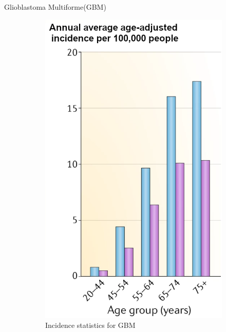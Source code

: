\documentclass[aspectratio=169,9pt]{beamer}
\begin{document}
\begin{frame}{Glioblastoma Multiforme(GBM)}
\begin{adjustwidth}{-5cm}{-5cm}
\begin{figure}
\begin{subfigure}{0.25\textwidth}
                    \includegraphics[width=\textwidth]{GBMincid}
                    \caption{Incidence statistics for GBM \footnotemark[2]}
                \end{subfigure}
                \begin{subfigure}{0.25\textwidth}
                    \centering

\end{subfigure}
\end{figure}
\end{adjustwidth}
\end{frame}
\end{document}
